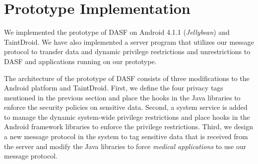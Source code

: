 \section{Prototype Implementation}

We implemented the prototype of DASF on Android 4.1.1 (\textit{Jellybean}) and
TaintDroid.  We have also implemented a server program that utilizes our
message protocol to transfer data and dynamic privilege restrictions and
unrestrictions to DASF and applications running on our prototype.  


The architecture of the prototype of DASF consists of three modifications to
the Android platform and TaintDroid. First, we define the four privacy tags
mentioned in the previous section and place the hooks in the Java libraries to
enforce the security policies on sensitive data.  Second, a system service is
added to manage the dynamic system-wide privilege restrictions and place hooks
in the Android framework libraries to enforce the privilege restrictions.
Third, we design a new message protocol in the system to tag sensitive data
that is received from the server and modify the Java libraries to force
\textit{medical applications} to use our message protocol.

